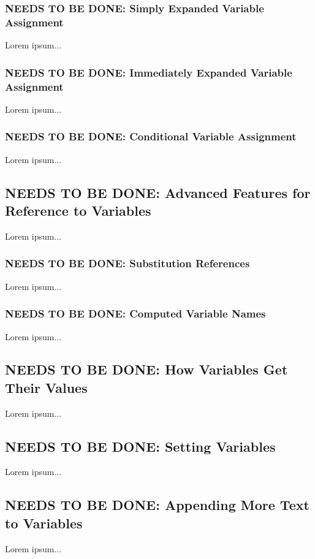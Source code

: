 \documentclass{charun}
\begin{document}
\begin{multicols*}{2}
\color{gray}
\subsubsection{NEEDS TO BE DONE: Simply Expanded Variable Assignment}
Lorem ipsum...
\color{black}

\color{gray}
\subsubsection{NEEDS TO BE DONE: Immediately Expanded Variable Assignment}
Lorem ipsum...
\color{black}

\color{gray}
\subsubsection{NEEDS TO BE DONE: Conditional Variable Assignment}
Lorem ipsum...
\color{black}

\color{gray}
\subsection{NEEDS TO BE DONE: Advanced Features for Reference to Variables}
Lorem ipsum...
\color{black}

\color{gray}
\subsubsection{NEEDS TO BE DONE: Substitution References}
Lorem ipsum...
\color{black}

\color{gray}
\subsubsection{NEEDS TO BE DONE: Computed Variable Names}
Lorem ipsum...
\color{black}

\color{gray}
\subsection{NEEDS TO BE DONE: How Variables Get Their Values}
Lorem ipsum...
\color{black}

\color{gray}
\subsection{NEEDS TO BE DONE: Setting Variables}
Lorem ipsum...
\color{black}

\color{gray}
\subsection{NEEDS TO BE DONE: Appending More Text to Variables}
Lorem ipsum...
\color{black}


\end{multicols*}
\end{document}

